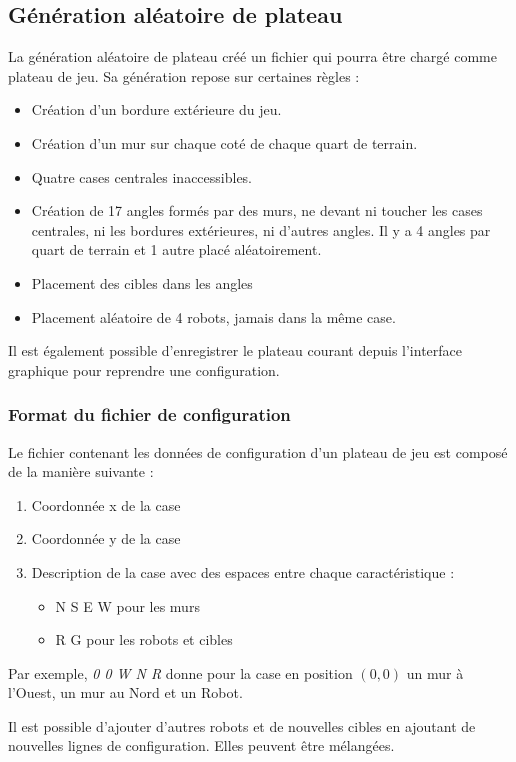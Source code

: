 \documentclass[a4paper]{article} %
\begin{document}
	\subsection{Génération aléatoire de plateau}
La génération aléatoire de plateau créé un fichier qui pourra être chargé comme plateau de jeu. Sa génération repose sur certaines règles :
\begin{itemize}
\item Création d'un bordure extérieure du jeu.
\item Création d'un mur sur chaque coté de chaque quart de terrain.
\item Quatre cases centrales inaccessibles.
\item Création de 17 angles formés par des murs, ne devant ni toucher les cases centrales, ni les bordures extérieures, ni d'autres angles. Il y a 4 angles par quart de terrain et 1 autre placé aléatoirement.
\item Placement des cibles dans les angles
\item Placement aléatoire de 4 robots, jamais dans la même case.
\end{itemize}

Il est également possible d'enregistrer le plateau courant depuis l'interface graphique pour reprendre une configuration.

		\subsubsection{Format du fichier de configuration}\label{structFichier}
Le fichier contenant les données de configuration d'un plateau de jeu est composé de la manière suivante :
\begin{enumerate}
\item Coordonnée x de la case
\item Coordonnée y de la case
\item Description de la case avec des espaces entre chaque caractéristique :
\begin{itemize}
\item N S E W pour les murs
\item R G pour les robots et cibles
\end{itemize}
\end{enumerate}
Par exemple, \textsl{0 0 W N R} donne pour la case en position $(0,0)$ un mur à l'Ouest, un mur au Nord et un Robot.

Il est possible d'ajouter d'autres robots et de nouvelles cibles en ajoutant de nouvelles lignes de configuration. Elles peuvent être mélangées.
\end{document}

